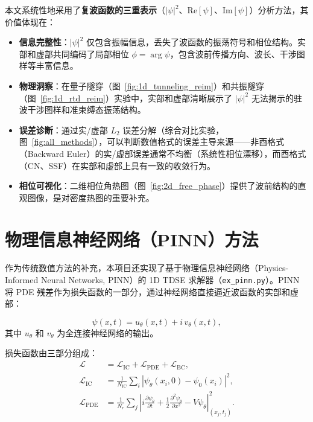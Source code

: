 \documentclass[12pt,a4paper]{article}
\begin{document}
本文系统性地采用了\textbf{复波函数的三重表示}（$|\psi|^2$、$\mathrm{Re}[\psi]$、$\mathrm{Im}[\psi]$）分析方法，其价值体现在：

\begin{itemize}
    \item \textbf{信息完整性}：$|\psi|^2$ 仅包含振幅信息，丢失了波函数的振荡符号和相位结构。实部和虚部共同编码了局部相位 $\phi = \arg\psi$，包含波前传播方向、波长、干涉图样等丰富信息。

    \item \textbf{物理洞察}：在量子隧穿（图~\ref{fig:1d_tunneling_reim}）和共振隧穿（图~\ref{fig:1d_rtd_reim}）实验中，实部和虚部清晰展示了 $|\psi|^2$ 无法揭示的驻波干涉图样和准束缚态振荡结构。

    \item \textbf{误差诊断}：通过实/虚部 $L_2$ 误差分解（综合对比实验，图~\ref{fig:all_methods}），可以判断数值格式的误差主导来源——非酉格式（Backward Euler）的实/虚部误差通常不均衡（系统性相位漂移），而酉格式（CN、SSF）在实部和虚部上具有一致的收敛行为。

    \item \textbf{相位可视化}：二维相位角热图（图~\ref{fig:2d_free_phase}）提供了波前结构的直观图像，是对密度热图的重要补充。
\end{itemize}

\appendix
\section{物理信息神经网络（PINN）方法}

作为传统数值方法的补充，本项目还实现了基于物理信息神经网络（Physics-Informed Neural Networks, PINN）的 1D TDSE 求解器（\texttt{ex\_pinn.py}）。PINN 将 PDE 残差作为损失函数的一部分，通过神经网络直接逼近波函数的实部和虚部：

\begin{equation}
    \psi(x,t) = u_\theta(x,t) + i\, v_\theta(x,t),
\end{equation}
其中 $u_\theta$ 和 $v_\theta$ 为全连接神经网络的输出。

损失函数由三部分组成：
\begin{align}
    \mathcal{L} &= \mathcal{L}_{\text{IC}} + \mathcal{L}_{\text{PDE}} + \mathcal{L}_{\text{BC}}, \\
    \mathcal{L}_{\text{IC}} &= \frac{1}{N_{\text{IC}}}\sum_{i} |\psi_\theta(x_i,0) - \psi_0(x_i)|^2, \\
    \mathcal{L}_{\text{PDE}} &= \frac{1}{N_r}\sum_{j} \left| i\frac{\partial\psi_\theta}{\partial t} + \frac{1}{2}\frac{\partial^2\psi_\theta}{\partial x^2} - V\psi_\theta \right|^2_{(x_j,t_j)}.
\end{align}
\end{document}
